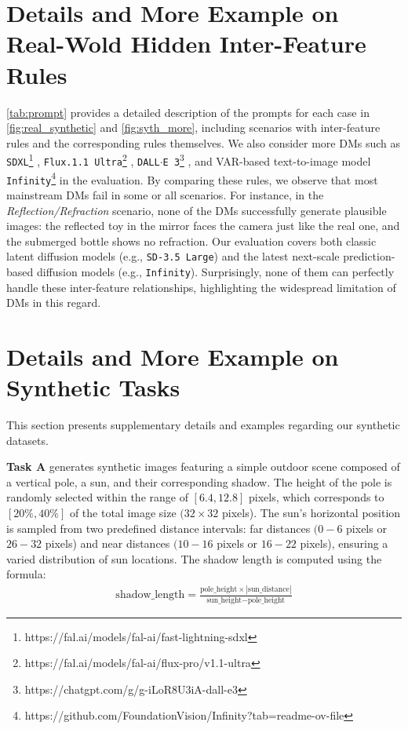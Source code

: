 \section{Details and More Example on Real-Wold Hidden Inter-Feature Rules}
\label{app:Details and More Example on Real-Wold Hidden Inter-Feature Rules}
\cref{tab:prompt} provides a detailed description of the prompts for each case in \cref{fig:real_synthetic} and \cref{fig:syth_more}, including scenarios with inter-feature rules and the corresponding rules themselves. We also consider more DMs such as \texttt{SDXL}\footnote{https://fal.ai/models/fal-ai/fast-lightning-sdxl} \cite{podell2023sdxl}, \texttt{Flux.1.1 Ultra}\footnote{https://fal.ai/models/fal-ai/flux-pro/v1.1-ultra} \cite{flux2023}, \texttt{DALL$\cdot$E 3}\footnote{https://chatgpt.com/g/g-iLoR8U3iA-dall-e3}  \cite{betker2023improving}, and VAR-based \cite{VAR} text-to-image model \texttt{Infinity}\footnote{https://github.com/FoundationVision/Infinity?tab=readme-ov-file} \cite{Infinity} in the evaluation.
By comparing these rules, we observe that most mainstream DMs fail in some or all scenarios. For instance, in the \textit{Reflection/Refraction} scenario, none of the DMs successfully generate plausible images: the reflected toy in the mirror faces the camera just like the real one, and the submerged bottle shows no refraction. Our evaluation covers both classic latent diffusion models (e.g., \texttt{SD-3.5 Large}) and the latest next-scale prediction-based diffusion models (e.g., \texttt{Infinity}). Surprisingly, none of them can perfectly handle these inter-feature relationships, highlighting the widespread limitation of DMs in this regard.
\section{Details and More Example on Synthetic Tasks}
\label{app:Details and More Example on Synthetic Tasks}
This section presents supplementary details and examples regarding our synthetic datasets.

\textbf{Task A} generates synthetic images featuring a simple outdoor scene composed of a vertical pole, a sun, and their corresponding shadow. The height of the pole is randomly selected within the range of \([6.4, 12.8]\) pixels, which corresponds to \([20\%, 40\%]\) of the total image size \((32 \times 32\) pixels). The sun's horizontal position is sampled from two predefined distance intervals: far distances \((0-6\) pixels or \(26-32\) pixels) and near distances \((10-16\) pixels or \(16-22\) pixels), ensuring a varied distribution of sun locations. The shadow length is computed using the formula:
\begin{align}
    \text{shadow\_length} = \frac{\text{pole\_height} \times |\text{sun\_distance}|}{\text{sun\_height} - \text{pole\_height}}
\end{align}

